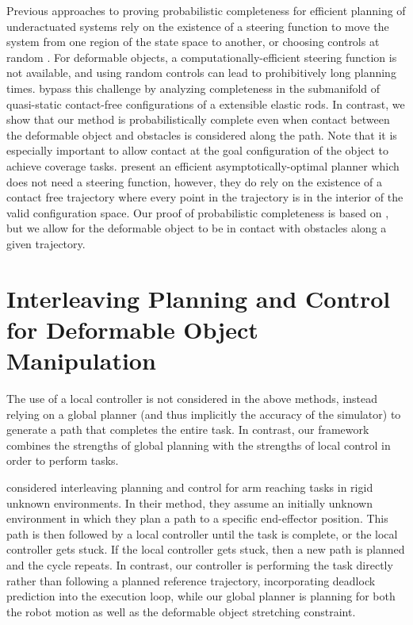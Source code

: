Previous approaches to proving probabilistic completeness for efficient planning of underactuated systems rely on the existence of a steering function to move the system from one region of the state space to another, or choosing controls at random \cite{LaValle2001, Karaman2013, Kunz2015, LiAOKP2016}. For deformable objects, a computationally-efficient steering function is not available, and using random controls can lead to prohibitively long planning times. \citet{Roussel2015} bypass this challenge by analyzing completeness in the submanifold of quasi-static contact-free configurations of a extensible elastic rods. In contrast, we show that our method is probabilistically complete even when contact between the deformable object and obstacles is considered along the path. Note that it is especially important to allow contact at the goal configuration of the object to achieve coverage tasks. \citet{LiAOKP2016} present an efficient asymptotically-optimal planner which does not need a steering function, however, they do rely on the existence of a contact free trajectory where every point in the trajectory is in the interior of the valid configuration space. Our proof of probabilistic completeness is based on \citet{LiAOKP2016}, but we allow for the deformable object to be in contact with obstacles along a given trajectory.


\section{Interleaving Planning and Control for Deformable Object Manipulation}

The use of a local controller is not considered in the above methods, instead relying on a global planner (and thus implicitly the accuracy of the simulator) to generate a path that completes the entire task. In contrast, our framework combines the strengths of global planning with the strengths of local control in order to perform tasks.

\citet{Park2014Interleaving} considered interleaving planning and control for arm reaching tasks in rigid unknown environments. In their method, they assume an initially unknown environment in which they plan a path to a specific end-effector position. This path is then followed by a local controller until the task is complete, or the local controller gets stuck. If the local controller gets stuck, then a new path is planned and the cycle repeats. In contrast, our controller is performing the task directly rather than following a planned reference trajectory, incorporating deadlock prediction into the execution loop, while our global planner is planning for both the robot motion as well as the deformable object stretching constraint.

